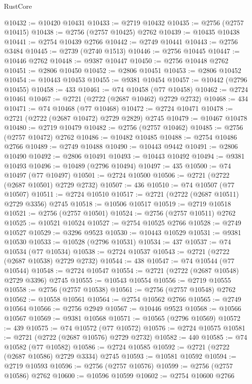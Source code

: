 \begin{lexlean}{RustCore}
\begin{coremodule}
@10432 := @10420 @10431
@10433 := @2719 @10432
@10435 := @2756 (@2757 @10415)
@10438 := @2756 (@2757 @10425) @2762
@10439 := @10435 @10438
@10441 := @2754 @10439 @2766
@10442 := @2749 @10441
@10443 := @2756 @3484
@10445 := @2739 (@2740 @1513)
@10446 := @2756 @10445
@10447 := @10446 @2762
@10448 := @9387 @10447
@10450 := @2756 @10448 @2762
@10451 := @2806 @10450
@10452 := @2806 @10451
@10453 := @2806 @10452
@10454 := @10443 @10453
@10455 := @9381 @10454
@10457 := @10442 (@2796 @10455)
@10458 := 433
@10461 := @74 @10458 (@77 @10458)
@10462 := @2724 @10461
@10467 := @2721 (@2722 (@2687 @10462) @2729 @2732)
@10468 := 434
@10471 := @74 @10468 (@77 @10468)
@10472 := @2724 @10471
@10478 := @2721 (@2722 (@2687 @10472) @2729 @2829) @2745
@10479 := @10467 @10478
@10480 := @2719 @10479
@10482 := @2756 (@2757 @10462)
@10485 := @2756 (@2757 @10472) @2762
@10486 := @10482 @10485
@10488 := @2754 @10486 @2766
@10489 := @2749 @10488
@10490 := @10443 @9442
@10491 := @2806 @10490
@10492 := @2806 @10491
@10493 := @10443 @10492
@10494 := @9381 @10493
@10496 := @10489 (@2796 @10494)
@10497 := 435
@10500 := @74 @10497 (@77 @10497)
@10501 := @2724 @10500
@10506 := @2721 (@2722 (@2687 @10501) @2729 @2732)
@10507 := 436
@10510 := @74 @10507 (@77 @10507)
@10511 := @2724 @10510
@10517 := @2721 (@2722 (@2687 @10511) @2729 @3356) @2745
@10518 := @10506 @10517
@10519 := @2719 @10518
@10521 := @2756 (@2757 @10501)
@10524 := @2756 (@2757 @10511) @2762
@10525 := @10521 @10524
@10527 := @2754 @10525 @2766
@10528 := @2749 @10527
@10529 := @3296 @9523
@10530 := @10443 @10529
@10531 := @9381 @10530
@10533 := @10528 (@2796 @10531)
@10534 := 437
@10537 := @74 @10534 (@77 @10534)
@10538 := @2724 @10537
@10543 := @2721 (@2722 (@2687 @10538) @2729 @2732)
@10544 := 438
@10547 := @74 @10544 (@77 @10544)
@10548 := @2724 @10547
@10554 := @2721 (@2722 (@2687 @10548) @2729 @3396) @2745
@10555 := @10543 @10554
@10556 := @2719 @10555
@10558 := @2756 (@2757 @10538)
@10561 := @2756 (@2757 @10548) @2762
@10562 := @10558 @10561
@10564 := @2754 @10562 @2766
@10565 := @2749 @10564
@10566 := @2756 @2949
@10567 := @10446 @9523
@10568 := @10566 @10567
@10569 := @9381 @10568
@10571 := @10565 (@2796 @10569)
@10572 := 439
@10575 := @74 @10572 (@77 @10572)
@10576 := @2724 @10575
@10581 := @2721 (@2722 (@2687 @10576) @2729 @2732)
@10582 := 440
@10585 := @74 @10582 (@77 @10582)
@10586 := @2724 @10585
@10592 := @2721 (@2722 (@2687 @10586) @2729 @3334) @2745
@10593 := @10581 @10592
@10594 := @2719 @10593
@10596 := @2756 (@2757 @10576)
@10599 := @2756 (@2757 @10586) @2762
@10600 := @10596 @10599
@10602 := @2754 @10600 @2766

\end{coremodule}
\end{lexlean}
